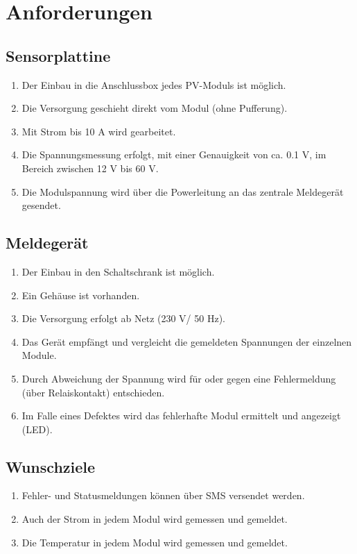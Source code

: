%
%
%
\section{Anforderungen}

\subsection{Sensorplattine}
\begin{enumerate}
\item Der Einbau in die Anschlussbox jedes PV-Moduls ist möglich.
\item Die Versorgung geschieht direkt vom Modul (ohne Pufferung).
\item Mit Strom bis 10 A wird gearbeitet.
\item	Die Spannungsmessung erfolgt, mit einer Genauigkeit von ca. 0.1 V, im Bereich zwischen 12 V bis 60 V.
\item	Die Modulspannung wird über die Powerleitung an das zentrale Meldegerät gesendet.
\end{enumerate}

\subsection{Meldegerät}
\begin{enumerate}
\item	Der Einbau in den Schaltschrank ist möglich.
\item	Ein Gehäuse ist vorhanden.
\item	Die Versorgung erfolgt ab Netz (230 V/ 50 Hz).
\item	Das Gerät empfängt und vergleicht die gemeldeten Spannungen der einzelnen Module.
\item	Durch Abweichung der Spannung wird für oder gegen eine Fehlermeldung (über Relaiskontakt) entschieden.
\item	Im Falle eines Defektes wird das fehlerhafte Modul ermittelt und angezeigt (LED).
\end{enumerate}

\subsection{Wunschziele}
\begin{enumerate}
\item	Fehler- und Statusmeldungen können über SMS versendet werden.
\item	Auch der Strom in jedem Modul wird gemessen und gemeldet.
\item	Die Temperatur in jedem Modul wird gemessen und gemeldet.
\end{enumerate}
%